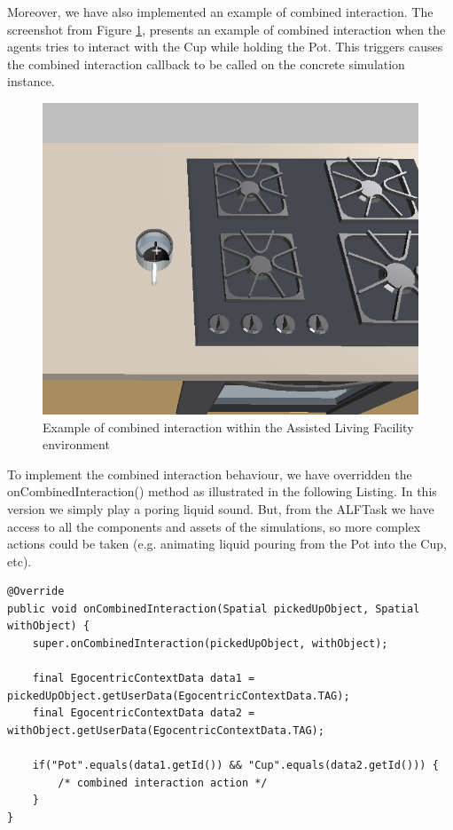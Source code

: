 Moreover, we have also implemented an example of combined interaction. The screenshot from Figure \ref{fig:impl_combined_interaction}, presents an example of combined interaction when the agents tries to interact with the Cup while holding the Pot. This triggers causes the combined interaction callback to be called on the concrete simulation instance.
\begin{figure}[H]
	\centering
	\includegraphics[width=0.8\linewidth]{gfx/Chapter4/pot_with_cup}
	\caption{Example of combined interaction within the Assisted Living Facility environment}
	\label{fig:impl_combined_interaction}
\end{figure}

To implement the combined interaction behaviour, we have overridden the onCombinedInteraction() method as illustrated in the following Listing. In this version we simply play a poring liquid sound. But, from the ALFTask we have access to all the components and assets of the simulations, so more complex actions could be taken (e.g. animating liquid pouring from the Pot into the Cup, etc).
\begin{lstlisting}[caption={Snippet of code illustrating how to implement a COMBINED interaction between two objects (when the agent acts upon an object while holding another object)},label={lst:combined_interaction}]
@Override
public void onCombinedInteraction(Spatial pickedUpObject, Spatial withObject) {
    super.onCombinedInteraction(pickedUpObject, withObject);    
    
    final EgocentricContextData data1 = pickedUpObject.getUserData(EgocentricContextData.TAG);
    final EgocentricContextData data2 = withObject.getUserData(EgocentricContextData.TAG);

    if("Pot".equals(data1.getId()) && "Cup".equals(data2.getId())) {
        /* combined interaction action */
    }
}
\end{lstlisting}

